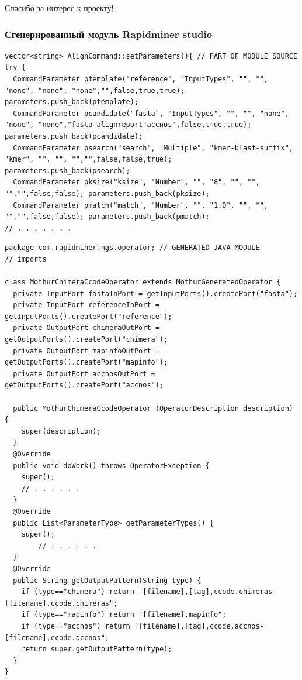 \documentclass[10pt]{beamer}
\begin{document}
\begin{frame}
  \begin{center}
  \Large Спасибо за интерес к проекту!
\end{center}
\end{frame}

\begin{frame}[fragile]
  \frametitle{Сгенерированный модуль Rapidminer studio}
\begin{verbatim}
vector<string> AlignCommand::setParameters(){ // PART OF MODULE SOURCE
try {
  CommandParameter ptemplate("reference", "InputTypes", "", "", "none", "none", "none","",false,true,true); parameters.push_back(ptemplate);
  CommandParameter pcandidate("fasta", "InputTypes", "", "", "none", "none", "none","fasta-alignreport-accnos",false,true,true); parameters.push_back(pcandidate);
  CommandParameter psearch("search", "Multiple", "kmer-blast-suffix", "kmer", "", "", "","",false,false,true); parameters.push_back(psearch);
  CommandParameter pksize("ksize", "Number", "", "8", "", "", "","",false,false); parameters.push_back(pksize);
  CommandParameter pmatch("match", "Number", "", "1.0", "", "", "","",false,false); parameters.push_back(pmatch);
// . . . . . . .
\end{verbatim}
\begin{verbatim}
package com.rapidminer.ngs.operator; // GENERATED JAVA MODULE
// imports

class MothurChimeraCcodeOperator extends MothurGeneratedOperator {
  private InputPort fastaInPort = getInputPorts().createPort("fasta");
  private InputPort referenceInPort = getInputPorts().createPort("reference");
  private OutputPort chimeraOutPort = getOutputPorts().createPort("chimera");
  private OutputPort mapinfoOutPort = getOutputPorts().createPort("mapinfo");
  private OutputPort accnosOutPort = getOutputPorts().createPort("accnos");

  public MothurChimeraCcodeOperator (OperatorDescription description) {
    super(description);
  }
  @Override
  public void doWork() throws OperatorException {
    super();
    // . . . . . .
  }
  @Override
  public List<ParameterType> getParameterTypes() {
    super();
        // . . . . . .
  }
  @Override
  public String getOutputPattern(String type) {
    if (type=="chimera") return "[filename],[tag],ccode.chimeras-[filename],ccode.chimeras";
    if (type=="mapinfo") return "[filename],mapinfo";
    if (type=="accnos") return "[filename],[tag],ccode.accnos-[filename],ccode.accnos";
    return super.getOutputPattern(type);
  }
}
\end{verbatim}
\end{frame}
\end{document}
